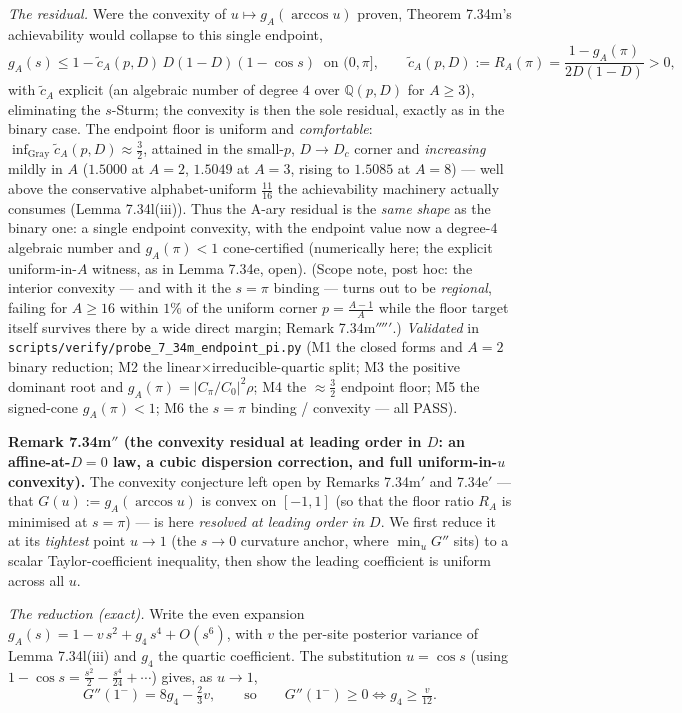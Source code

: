 \documentclass[
]{article}
\begin{document}
\emph{The residual.} Were the convexity of $u\mapsto g_A(\arccos u)$ proven,
Theorem 7.34m's achievability would collapse to this single endpoint,
\[
  g_A(s)\le1-\tilde c_A(p,D)\,D(1-D)(1-\cos s)\ \text{ on }(0,\pi],\qquad
  \tilde c_A(p,D):=R_A(\pi)=\frac{1-g_A(\pi)}{2D(1-D)}>0,
\]
with $\tilde c_A$ explicit (an algebraic number of degree $4$ over
$\mathbb Q(p,D)$ for $A\ge3$), eliminating the $s$-Sturm; the convexity is then
the sole residual, exactly as in the binary case. The endpoint floor is uniform
and \emph{comfortable}: $\inf_{\text{Gray}}\tilde c_A(p,D)\approx\tfrac32$,
attained in the small-$p$, $D\to D_c$ corner and \emph{increasing} mildly in $A$
($1.5000$ at $A=2$, $1.5049$ at $A=3$, rising to $1.5085$ at $A=8$) --- well
above the conservative alphabet-uniform $\tfrac{11}{16}$ the achievability
machinery actually consumes (Lemma 7.34l(iii)). Thus the A-ary residual is the
\emph{same shape} as the binary one: a single endpoint convexity, with the
endpoint value now a degree-$4$ algebraic number and $g_A(\pi)<1$ cone-certified
(numerically here; the explicit uniform-in-$A$ witness, as in Lemma 7.34e,
open).
(Scope note, post hoc: the interior convexity --- and with it the $s=\pi$
binding --- turns out to be \emph{regional}, failing for $A\ge16$ within $1\%$
of the uniform corner $p=\tfrac{A-1}A$ while the floor target itself survives
there by a wide direct margin; Remark 7.34m$'''''$.)
\emph{Validated} in
\texttt{scripts/verify/probe\_7\_34m\_endpoint\_pi.py} (M1 the closed forms and
$A=2$ binary reduction; M2 the linear$\times$irreducible-quartic split; M3 the
positive dominant root and $g_A(\pi)=|C_\pi/C_0|^2\rho$; M4 the $\approx\tfrac32$
endpoint floor; M5 the signed-cone $g_A(\pi)<1$; M6 the $s=\pi$ binding /
convexity --- all PASS).

\textbf{Remark 7.34m$''$ (the convexity residual at leading order in $D$: an
affine-at-$D{=}0$ law, a cubic dispersion correction, and full uniform-in-$u$
convexity).} The convexity conjecture left open by Remarks 7.34m$'$ and
7.34e$'$ --- that $G(u):=g_A(\arccos u)$ is convex on $[-1,1]$ (so that the floor
ratio $R_A$ is minimised at $s=\pi$) --- is here \emph{resolved at leading order
in $D$}. We first reduce it at its \emph{tightest} point $u\to1$ (the $s\to0$
curvature anchor, where $\min_u G''$ sits) to a scalar Taylor-coefficient
inequality, then show the leading coefficient is uniform across all $u$.

\emph{The reduction (exact).} Write the even expansion $g_A(s)=1-v\,s^2
+g_4\,s^4+O(s^6)$, with $v$ the per-site posterior variance of Lemma 7.34l(iii)
and $g_4$ the quartic coefficient. The substitution $u=\cos s$ (using
$1-\cos s=\tfrac{s^2}2-\tfrac{s^4}{24}+\cdots$) gives, as $u\to1$,
\[
  G''(1^-)=8g_4-\tfrac23 v,\qquad\text{so}\qquad
  G''(1^-)\ge0\iff g_4\ge\tfrac{v}{12}.
\]
\end{document}
